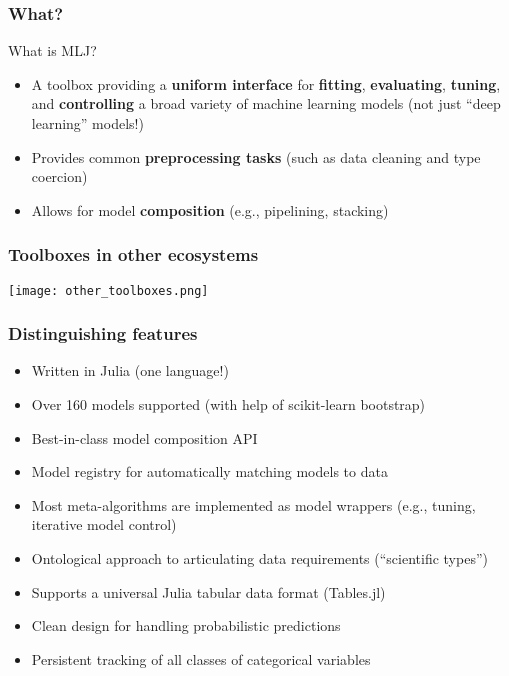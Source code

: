 \documentclass[t]{beamer}
\newcommand\df{\bf\color{Maroon}}
\begin{document}
\begin{frame}
  \frametitle{What?}
  \begin{block}{What is MLJ?}\pause
     \begin{itemize}
     \item A toolbox providing a {\df uniform interface} for {\df
         fitting}, {\df evaluating}, {\df tuning}, and {\df
         controlling} a broad variety of machine learning models (not
       just ``deep learning'' models!)
          \item Provides common {\df preprocessing tasks} (such as data cleaning
            and type coercion)
          \item Allows for model {\df composition} (e.g., pipelining, stacking)
      \end{itemize}
    \end{block}
  \end{frame}

\begin{frame}
\frametitle{Toolboxes in other ecosystems}
  \begin{center}
    \texttt{[image: other\_toolboxes.png]}
  \end{center}
\end{frame}


\begin{frame}
  \frametitle{Distinguishing features}
     \begin{itemize}
     \item Written in Julia (one language!)\pause
     \item Over 160 models supported (with help of scikit-learn bootstrap)\pause
     \item Best-in-class model composition API\pause
     \item Model registry for automatically matching models to data\pause
     \item Most meta-algorithms are implemented as model wrappers
       (e.g., tuning, iterative model control)\pause
     \item Ontological approach to articulating data requirements
       (``scientific types'')\pause
     \item Supports a universal Julia tabular data format (Tables.jl)\pause
     \item Clean design for handling probabilistic predictions\pause
     \item Persistent tracking of all classes of categorical variables
      \end{itemize}
\end{frame}
\end{document}
